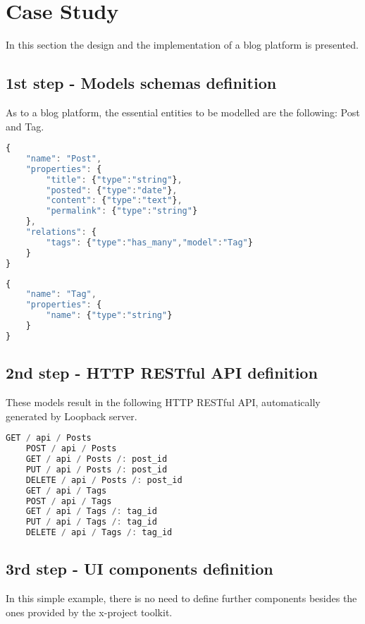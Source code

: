 \section{Case Study}
\label{sec:CAS_castudy}

In this section the design and the implementation of a blog platform is presented.

\subsection{1st step - Models schemas definition}

As to a blog platform, the essential entities to be modelled are the following: Post and Tag.

\begin{lstlisting}[language=javascript]
{
	"name": "Post",
	"properties": {
		"title": {"type":"string"},
		"posted": {"type":"date"},
		"content": {"type":"text"},
		"permalink": {"type":"string"}
	},
	"relations": {
		"tags": {"type":"has_many","model":"Tag"}
	}
}
\end{lstlisting}

\begin{lstlisting}[language=javascript]
{
	"name": "Tag",
	"properties": {
		"name": {"type":"string"}
	}
}
\end{lstlisting}

\subsection{2nd step - HTTP RESTful API definition}

These models result in the following HTTP RESTful API, automatically generated by Loopback server.

\begin{lstlisting}[language=javascript]
	GET / api / Posts
	POST / api / Posts
	GET / api / Posts /: post_id
	PUT / api / Posts /: post_id
	DELETE / api / Posts /: post_id
	GET / api / Tags
	POST / api / Tags
	GET / api / Tags /: tag_id
	PUT / api / Tags /: tag_id
	DELETE / api / Tags /: tag_id
\end{lstlisting}

\subsection{3rd step - UI components definition}

In this simple example, there is no need to define further components besides the ones provided by the x-project toolkit.

